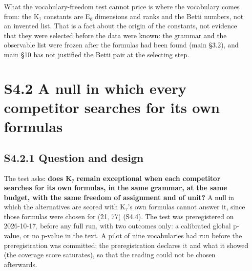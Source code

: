\documentclass[11pt,a4paper]{article}
\begin{document}
What the vocabulary-freedom test cannot price is where the vocabulary comes from: the K₇ constants are E₈ dimensions and ranks and the Betti numbers, not an invented list. That is a fact about the origin of the constants, not evidence that they were selected before the data were known: the grammar and the observable list were frozen after the formulas had been found (main §3.2), and main §10 has not justified the Betti pair at the selecting step.

\section{S4.2 A null in which every competitor searches for its own formulas}\label{s4.2-a-null-in-which-every-competitor-searches-for-its-own-formulas}

\subsection{S4.2.1 Question and design}\label{s4.2.1-question-and-design}

The test asks: \textbf{does K₇ remain exceptional when each competitor searches for its own formulas, in the same grammar, at the same budget, with the same freedom of assignment and of unit?} A null in which the alternatives are scored with K₇'s own formulas cannot answer it, since those formulas were chosen for (21, 77) (S4.4). The test was preregistered on 2026-10-17, before any full run, with two outcomes only: a calibrated global p-value, or no p-value in the text. A pilot of nine vocabularies had run before the preregistration was committed; the preregistration declares it and what it showed (the coverage score saturates), so that the reading could not be chosen afterwards.
\end{document}
